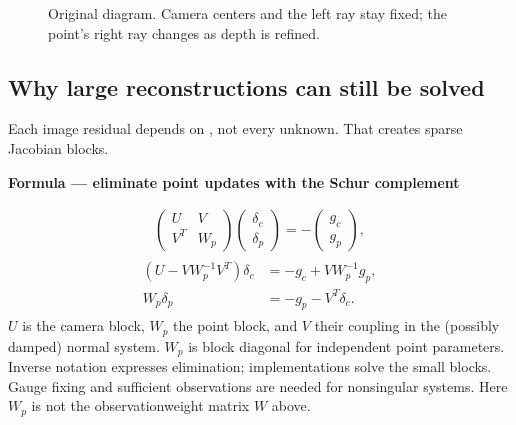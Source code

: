 \documentclass[letterpaper,11pt,english,openany,oneside]{jupyterBook}
\begin{document}
\begin{figure}[H]
\centering
\capstart

\noindent{}
\caption{Original diagram. Camera centers and the left ray stay fixed; the point’s right ray changes as depth is refined.}\label{\detokenize{lectures/lecture06/optimization:fig-lec06-refinement}}\end{figure}

\par\medskip


\subsection{Why large reconstructions can still be solved}
\label{\detokenize{lectures/lecture06/optimization:why-large-reconstructions-can-still-be-solved}}
\sphinxAtStartPar
Each image residual depends on , not every unknown. That creates sparse Jacobian blocks.

\begin{TextbookBox}
\textbf{Formula — eliminate point updates with the Schur complement}\par\smallskip
\begin{equation}\label{equation:lectures/lecture06/optimization:eq-lec06-schur}
\begin{split}\begin{pmatrix}U&V\\V^T&W_p\end{pmatrix}
\begin{pmatrix}\delta_c\\\delta_p\end{pmatrix}
=-\begin{pmatrix}g_c\\g_p\end{pmatrix},\end{split}
\end{equation}\begin{equation*}
\begin{split}\begin{aligned}
(U-VW_p^{-1}V^T)\delta_c&=-g_c+VW_p^{-1}g_p,\\
W_p\delta_p&=-g_p-V^T\delta_c.
\end{aligned}\end{split}
\end{equation*}
\sphinxAtStartPar
\(U\) is the camera block, \(W_p\) the point block, and \(V\) their coupling in the (possibly damped) normal system. \(W_p\) is block diagonal for independent point parameters. Inverse notation expresses elimination; implementations solve the small blocks. Gauge fixing and sufficient observations are needed for nonsingular systems. Here \(W_p\) is not the observation\sphinxhyphen{}weight matrix \(W\) above.

\end{TextbookBox}
\end{document}
